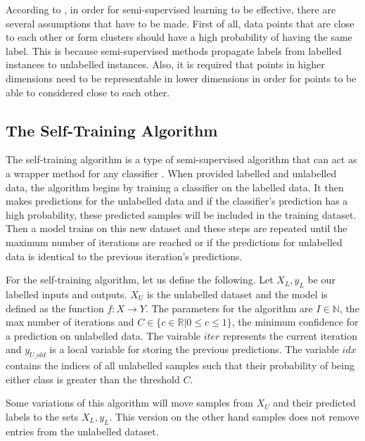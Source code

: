 \documentclass[../main.tex]{subfiles}
\begin{document}
According to \cite{chapelle2006semi}, in order for semi-supervised learning to be effective, there are several assumptions that have to be made. First of all, data points that are close to each other or form clusters should have a high probability of having the same label. This is because semi-supervised methods propagate labels from labelled instances to unlabelled instances. Also, it is required that points in higher dimensions need to be representable in lower dimensions in order for points to be able to considered close to each other. 

\subsection{The Self-Training Algorithm} \label{section:selfTrain}

The self-training algorithm is a type of semi-supervised algorithm that can act as a wrapper method for any classifier \cite{triguero2015self}. When provided labelled and unlabelled data, the algorithm begins by training a classifier on the labelled data. It then makes predictions for the unlabelled data and if the classifier's prediction has a high probability, these predicted samples will be included in the training dataset. Then a model trains on this new dataset and these steps are repeated until the maximum number of iterations are reached or if the predictions for unlabelled data is identical to the previous iteration's predictions. 

For the self-training algorithm, let us define the following. Let $X_L, y_L$ be our labelled inputs and outputs. $X_U$ is the unlabelled dataset and the model is defined as the function $f:X \rightarrow Y$. The parameters for the algorithm are $I \in \mathbb{N}$, the max number of iterations and $C \in \{c \in \mathbb{R} | 0 \leq c \leq 1\}$, the minimum confidence for a prediction on unlabelled data. The vairable $iter$ represents the current iteration and $y_{U\_old}$ is a local variable for storing the previous predictions. The variable $idx$ contains the indices of all unlabelled samples such that their probability of being either class is greater than the threshold $C$. 

Some variations of this algorithm will move samples from $X_U$ and their predicted labels to the sets $X_L,y_L$. This version on the other hand samples does not remove entries from the unlabelled dataset.
\end{document}
